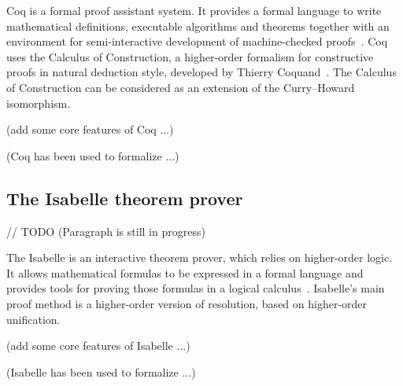 \documentclass[article]{aaltoseries}
\begin{document}
Coq is a formal proof assistant system. It provides a formal language to write mathematical definitions, executable algorithms and theorems together with an environment for semi-interactive development of machine-checked proofs~\cite{tool_Coq}. Coq uses the Calculus of Construction, a higher-order formalism for constructive proofs in natural deduction style, developed by Thierry Coquand~\cite{Coq86}. 
The Calculus of Construction can be considered as an extension of the Curry–Howard isomorphism. %

(add some core features of Coq ...)

(Coq has been used to formalize ...)


\subsection{The Isabelle theorem prover}
\label{sec:prover_isabelle}

// TODO (Paragraph is still in progress)

The Isabelle is an interactive theorem prover, which relies on higher-order logic. It allows mathematical formulas to be expressed in a formal language and provides tools for proving those formulas in a logical calculus~\cite{tool_Isabelle}. Isabelle's main proof method is a higher-order version of resolution, based on higher-order unification.

(add some core features of Isabelle ...)

(Isabelle has been used to formalize ...)

\end{document}

